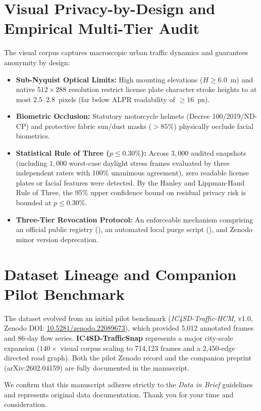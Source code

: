 \documentclass[10.5pt,a4paper]{article}
\begin{document}
\section*{Visual Privacy-by-Design and Empirical Multi-Tier Audit}
The visual corpus captures macroscopic urban traffic dynamics and guarantees anonymity by design:
\begin{itemize}[noitemsep,topsep=2pt]
    \item \textbf{Sub-Nyquist Optical Limits:} High mounting elevations ($H \ge 6.0$~m) and native $512 \times 288$ resolution restrict license plate character stroke heights to at most $2.5$--$2.8$~pixels (far below ALPR readability of $\ge 16$~px).
    \item \textbf{Biometric Occlusion:} Statutory motorcycle helmets (Decree 100/2019/ND-CP) and protective fabric sun/dust masks ($>85\%$) physically occlude facial biometrics.
    \item \textbf{Statistical Rule of Three ($p \le 0.30\%$):} Across $3,000$ audited snapshots (including $1,000$ worst-case daylight stress frames evaluated by three independent raters with 100\% unanimous agreement), zero readable license plates or facial features were detected. By the Hanley and Lippman-Hand Rule of Three, the 95\% upper confidence bound on residual privacy risk is bounded at $p \le 0.30\%$.
    \item \textbf{Three-Tier Revocation Protocol:} An enforceable mechanism comprising an official public registry (), an automated local purge script (), and Zenodo minor version deprecation.
\end{itemize}

\section*{Dataset Lineage and Companion Pilot Benchmark}
The dataset evolved from an initial pilot benchmark (\textit{IC4SD-Traffic-HCM}, v1.0, Zenodo DOI: \href{https://doi.org/10.5281/zenodo.22089673}{10.5281/zenodo.22089673}), which provided 5,012 annotated frames and 86-day flow series. \textbf{IC4SD-TrafficSnap} represents a major city-scale expansion ($140\times$ visual corpus scaling to 714,123 frames and a 2,450-edge directed road graph). Both the pilot Zenodo record and the companion preprint (arXiv:2602.04159) are fully documented in the manuscript.

\vspace{4mm}
\noindent
We confirm that this manuscript adheres strictly to the \textit{Data in Brief} guidelines and represents original data documentation. Thank you for your time and consideration.
\end{document}
